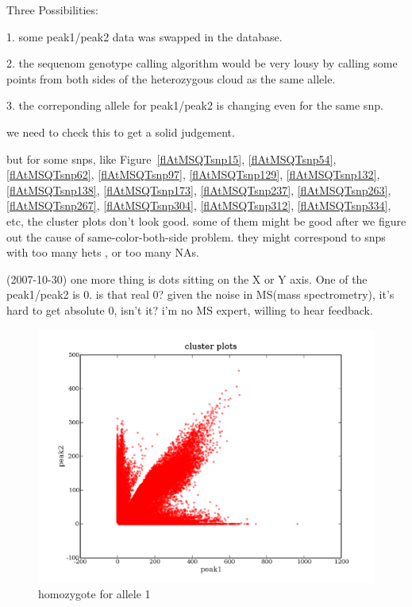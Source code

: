 \documentclass[a4paper,10pt]{article}
\begin{document}
Three Possibilities:

1. some peak1/peak2 data was swapped in the database.

2. the sequenom genotype calling algorithm would be very lousy by calling some points from both sides of the heterozygous cloud as the same allele.

3. the correponding allele for peak1/peak2 is changing even for the same snp.


we need to check this to get a solid judgement.

but for some snps, like Figure~\ref{flAtMSQTsnp15}, \ref{flAtMSQTsnp54}, \ref{flAtMSQTsnp62}, \ref{flAtMSQTsnp97}, \ref{flAtMSQTsnp129}, \ref{flAtMSQTsnp132}, \ref{flAtMSQTsnp138}, \ref{flAtMSQTsnp173}, \ref{flAtMSQTsnp237}, \ref{flAtMSQTsnp263}, \ref{flAtMSQTsnp267}, \ref{flAtMSQTsnp304}, \ref{flAtMSQTsnp312}, \ref{flAtMSQTsnp334}, etc, the cluster plots don't look good. some of them might be good after we figure out the cause of same-color-both-side problem. they might correspond to snps with too many hets , or too many NAs.

(2007-10-30) one more thing is dots sitting on the X or Y axis. One of the peak1/peak2 is 0. is that real 0? given the noise in MS(mass spectrometry), it's hard to get absolute 0, isn't it? i'm no MS expert, willing to hear feedback.


\begin{figure}
\includegraphics[width=1\textwidth]{figures/cluster_plots_allele1.png}
\caption{homozygote for allele 1}\label{f1}
\end{figure}
\end{document}
